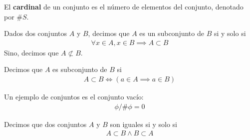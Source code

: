 \documentclass{../Topologia.tex}
\begin{document}
\begin{defin}
	El \textbf{cardinal} de un conjunto es el número de elementos del conjunto,
	denotado por $\#S$. 
\end{defin}
Dados dos conjuntos $A$ y $B$, decimos que $A$ es un subconjunto de $B$ si y solo
si
\begin{equation}
	\begin{split}
		\forall x \in A, x \in B \implies A \subset B
	\end{split}
\end{equation}
Sino, decimos que $A \not\subset B$.
\begin{defin}
	Decimos que $A$ es subconjunto de $B$ si
	\begin{equation}
		\begin{split}
			A \subset B \iff (a \in A \implies a \in B)
		\end{split}
	\end{equation}
\end{defin}
Un ejemplo de conjuntos es el conjunto vacío:
\begin{equation}
	\begin{split}
		\phi / \# \phi = 0
	\end{split}
\end{equation}
\begin{defin}
	Decimos que dos conjuntos $A$ y $B$ son iguales si y solo si
	\begin{equation}
		\begin{split}
			A \subset B \wedge B \subset A
		\end{split}
	\end{equation}
\end{defin}
\end{document}
